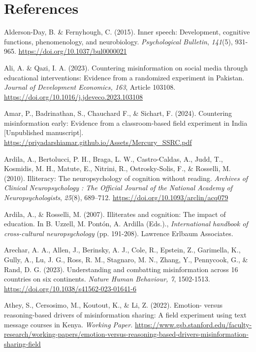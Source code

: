\documentclass[authordate, reflection, issue]{jote-new-article}
\begin{document}
	\section{References}



	Alderson-Day, B. \& Fernyhough, C. (2015). Inner speech: Development, cognitive functions, phenomenology, and neurobiology. \emph{Psychological Bulletin}, \emph{141}(5), 931-965. \url{https://doi.org/10.1037/bul0000021}



	Ali, A. \& Qazi, I. A. (2023). Countering misinformation on social media through educational interventions: Evidence from a randomized experiment in Pakistan. \emph{Journal of Development Economics, 163}, Article 103108. \url{https://doi.org/10.1016/j.jdeveco.2023.103108}



	Amar, P., Badrinathan, S., Chauchard F., \& Sichart, F. (2024). Countering misinformation early: Evidence from a classroom-based field experiment in India [Unpublished manuscript]. \url{https://priyadarshiamar.github.io/Assets/Mercury\_SSRC.pdf}



	Ardila, A., Bertolucci, P. H., Braga, L. W., Castro-Caldas, A., Judd, T., Kosmidis, M. H., Matute, E., Nitrini, R., Ostrosky-Solis, F., \& Rosselli, M. (2010). Illiteracy: The neuropsychology of cognition without reading. \emph{Archives of Clinical Neuropsychology : The Official Journal of the National Academy of Neuropsychologists}, \emph{25}(8), 689--712. \url{https://doi.org/10.1093/arclin/acq079}



	Ardila, A., \& Rosselli, M. (2007). Illiterates and cognition: The impact of education. In B. Uzzell, M. Pontón, A. Ardilla (Eds.)., \emph{International handbook of cross-cultural neuropsychology }(pp. 191-208). Lawrence Erlbaum Associates.



	Arechar, A. A., Allen, J., Berinsky, A. J., Cole, R., Epstein, Z., Garimella, K., Gully, A., Lu, J. G., Ross, R. M., Stagnaro, M. N., Zhang, Y., Pennycook, G., \& Rand, D. G. (2023). Understanding and combatting misinformation across 16 countries on six continents. \emph{Nature Human Behaviour, 7}, 1502-1513. \url{https://doi.org/10.1038/s41562-023-01641-6}



	Athey, S., Cersosimo, M., Koutout, K., \& Li, Z. (2022). Emotion- versus reasoning-based drivers of misinformation sharing: A field experiment using text message courses in Kenya. \emph{Working Paper.} \url{https://www.gsb.stanford.edu/faculty-research/working-papers/emotion-versus-reasoning-based-drivers-misinformation-sharing-field}
\end{document}
